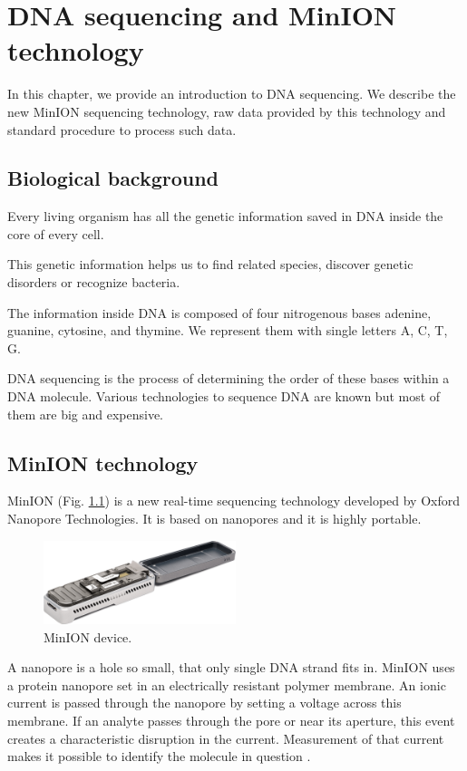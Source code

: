 \chapter[DNA sequencing]{DNA sequencing and MinION technology}
\label{kap:bio}

In this chapter, we provide an introduction to DNA sequencing.
We describe the new MinION sequencing technology, raw data provided 
by this technology and standard procedure to process such data.

\section{Biological background}
Every living organism has all the genetic information saved in DNA inside the core of every cell.

This genetic information helps us to find related species, discover genetic disorders or recognize bacteria.

The information inside DNA is composed of four nitrogenous bases adenine, guanine, cytosine, and thymine. 
We represent them with single letters A, C, T, G.

DNA sequencing is the process of determining the order of these bases within a DNA molecule. 
Various technologies to sequence DNA are known but most of them are big and expensive.

\section{MinION technology}

MinION (Fig. \ref{fig:minion}) is a new real-time sequencing technology developed by Oxford Nanopore
Technologies. It is based on nanopores and it is highly portable. 

\begin{figure}
  \centering
  
  \includegraphics[width=0.5\textwidth]{images/minion}
  \caption{MinION device.}
  \label{fig:minion}
\end{figure}

A nanopore is a hole so small, that only single DNA strand fits in. MinION
uses a protein nanopore set in an electrically resistant polymer membrane. 
An ionic current is passed through the nanopore by setting a voltage across this membrane. If an analyte passes through the pore or near its aperture, 
this event creates a characteristic disruption in the current. Measurement of that current makes it possible to identify the molecule in question \cite{oxford}.


